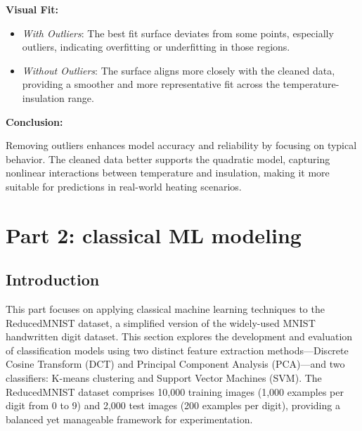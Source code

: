 \documentclass[12pt]{article}
\begin{document}
\checkmark \textbf{Visual Fit:}
\begin{itemize}
    \item \textit{With Outliers}: The best fit surface deviates from some points, especially outliers, indicating overfitting or underfitting in those regions.
    \item \textit{Without Outliers}: The surface aligns more closely with the cleaned data, providing a smoother and more representative fit across the temperature-insulation range.
\end{itemize}
\begin{adjustwidth}{0cm}{0cm}
\checkmark \textbf{Conclusion:}
\end{adjustwidth}
Removing outliers enhances model accuracy and reliability by focusing on typical behavior. The cleaned data better supports the quadratic model, capturing nonlinear interactions between temperature and insulation, making it more suitable for predictions in real-world heating scenarios.




\newpage
\section{Part 2: classical ML modeling}
\subsection{Introduction}

 This part focuses on applying classical machine learning techniques to the ReducedMNIST dataset, a simplified version of the widely-used MNIST handwritten digit dataset. This section explores the development and evaluation of classification models using two distinct feature extraction methods---Discrete Cosine Transform (DCT) and Principal Component Analysis (PCA)---and two classifiers: K-means clustering and Support Vector Machines (SVM). The ReducedMNIST dataset comprises 10,000 training images (1,000 examples per digit from 0 to 9) and 2,000 test images (200 examples per digit), providing a balanced yet manageable framework for experimentation.
\end{document}
